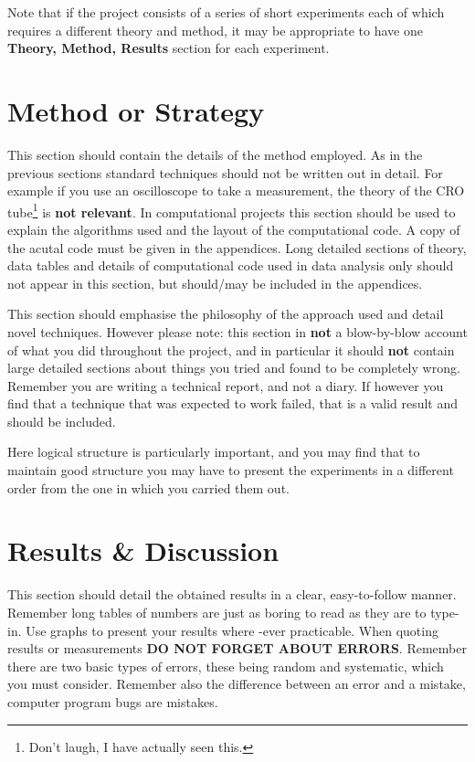 \documentclass[a4paper,12pt]{article}
\begin{document}
Note that if the project consists of a series of short experiments
each of which requires a different theory and method, it may be appropriate
to have one {\bf Theory, Method, Results} section for each
experiment.
\section{Method or Strategy}

This section should contain the details of the method employed. 
As in the previous sections standard techniques should not be written
out in detail. For example if you use an oscilloscope to take a
measurement, the theory of the CRO tube\footnote{Don't laugh, I have actually
seen this.} is {\bf not relevant}. In computational projects this
section should be used to explain the algorithms used and the layout of
the computational code. A copy of the acutal code must be
given in the appendices. Long detailed sections of theory, data tables
and details of computational code used in data analysis only should not
appear in this section, but should/may be included in the appendices.

This section should emphasise the philosophy of the approach used
and detail novel techniques. However
please note: this section in {\bf not} a blow-by-blow account of what
you did throughout the project, and in particular it should {\bf not} 
contain large detailed sections about things you tried and found to be
completely wrong. Remember you are writing a technical report, and
not a diary. If however you find that a technique that was expected to
work failed, that is a valid result and should be included.

Here logical structure is particularly important, and you may find that
to maintain good structure you may have to present the experiments
in a different order from the one in which you carried them out.
\section{Results \& Discussion}

This section should detail the obtained results in a clear,
easy-to-follow manner. Remember long tables of numbers are just as boring to
read as they are to type-in. Use graphs to present your results where
-ever practicable. When quoting results or measurements
{\bf DO NOT FORGET ABOUT ERRORS}. Remember there are two basic types
of errors, these being random and systematic, which you must consider.
Remember also the difference between an error and a mistake, computer
program bugs are mistakes.
\end{document}
